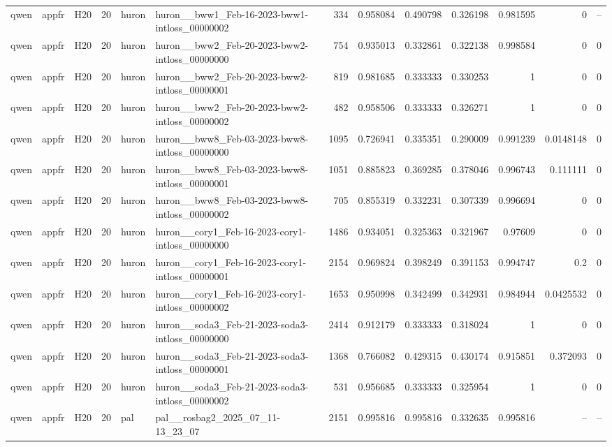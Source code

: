 \begin{longtable}{lllrllrrrrrrr}
qwen & appfr & H20 & 20 & huron & huron\_\_bww1\_Feb-16-2023-bww1-intloss\_00000002 & 334 & 0.958084 & 0.490798 & 0.326198 & 0.981595 & 0 & -- \\
qwen & appfr & H20 & 20 & huron & huron\_\_bww2\_Feb-20-2023-bww2-intloss\_00000000 & 754 & 0.935013 & 0.332861 & 0.322138 & 0.998584 & 0 & 0 \\
qwen & appfr & H20 & 20 & huron & huron\_\_bww2\_Feb-20-2023-bww2-intloss\_00000001 & 819 & 0.981685 & 0.333333 & 0.330253 & 1 & 0 & 0 \\
qwen & appfr & H20 & 20 & huron & huron\_\_bww2\_Feb-20-2023-bww2-intloss\_00000002 & 482 & 0.958506 & 0.333333 & 0.326271 & 1 & 0 & 0 \\
qwen & appfr & H20 & 20 & huron & huron\_\_bww8\_Feb-03-2023-bww8-intloss\_00000000 & 1095 & 0.726941 & 0.335351 & 0.290009 & 0.991239 & 0.0148148 & 0 \\
qwen & appfr & H20 & 20 & huron & huron\_\_bww8\_Feb-03-2023-bww8-intloss\_00000001 & 1051 & 0.885823 & 0.369285 & 0.378046 & 0.996743 & 0.111111 & 0 \\
qwen & appfr & H20 & 20 & huron & huron\_\_bww8\_Feb-03-2023-bww8-intloss\_00000002 & 705 & 0.855319 & 0.332231 & 0.307339 & 0.996694 & 0 & 0 \\
qwen & appfr & H20 & 20 & huron & huron\_\_cory1\_Feb-16-2023-cory1-intloss\_00000000 & 1486 & 0.934051 & 0.325363 & 0.321967 & 0.97609 & 0 & 0 \\
qwen & appfr & H20 & 20 & huron & huron\_\_cory1\_Feb-16-2023-cory1-intloss\_00000001 & 2154 & 0.969824 & 0.398249 & 0.391153 & 0.994747 & 0.2 & 0 \\
qwen & appfr & H20 & 20 & huron & huron\_\_cory1\_Feb-16-2023-cory1-intloss\_00000002 & 1653 & 0.950998 & 0.342499 & 0.342931 & 0.984944 & 0.0425532 & 0 \\
qwen & appfr & H20 & 20 & huron & huron\_\_soda3\_Feb-21-2023-soda3-intloss\_00000000 & 2414 & 0.912179 & 0.333333 & 0.318024 & 1 & 0 & 0 \\
qwen & appfr & H20 & 20 & huron & huron\_\_soda3\_Feb-21-2023-soda3-intloss\_00000001 & 1368 & 0.766082 & 0.429315 & 0.430174 & 0.915851 & 0.372093 & 0 \\
qwen & appfr & H20 & 20 & huron & huron\_\_soda3\_Feb-21-2023-soda3-intloss\_00000002 & 531 & 0.956685 & 0.333333 & 0.325954 & 1 & 0 & 0 \\
qwen & appfr & H20 & 20 & pal & pal\_\_rosbag2\_2025\_07\_11-13\_23\_07 & 2151 & 0.995816 & 0.995816 & 0.332635 & 0.995816 & -- & -- \\

\end{longtable}
